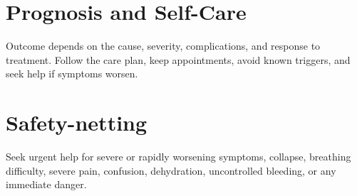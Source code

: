\section*{Prognosis and Self-Care}
Outcome depends on the cause, severity, complications, and response to treatment. Follow the care plan, keep appointments, avoid known triggers, and seek help if symptoms worsen.
\section*{Safety-netting}
Seek urgent help for severe or rapidly worsening symptoms, collapse, breathing difficulty, severe pain, confusion, dehydration, uncontrolled bleeding, or any immediate danger.
